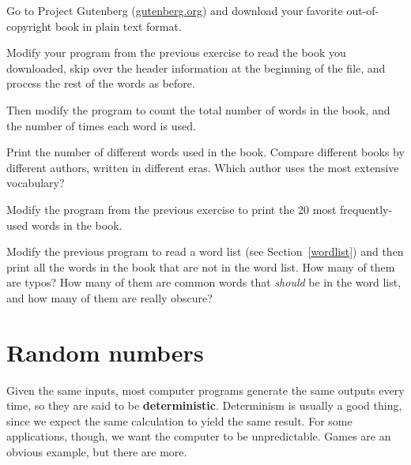 \documentclass[10pt]{book}
\begin{document}
\begin{exercise}

Go to Project Gutenberg (\url{gutenberg.org}) and download
your favorite out-of-copyright book in plain text format.

Modify your program from the previous exercise to read the book
you downloaded, skip over the header information at the beginning
of the file, and process the rest of the words as before.

Then modify the program to count the total number of words in
the book, and the number of times each word is used.

Print the number of different words used in the book.  Compare
different books by different authors, written in different eras.
Which author uses the most extensive vocabulary?
\end{exercise}


\begin{exercise}

Modify the program from the previous exercise to print the
20 most frequently-used words in the book.

\end{exercise}


\begin{exercise}

Modify the previous program to read a word list (see
Section~\ref{wordlist}) and then print all the words in the book that
are not in the word list.  How many of them are typos?  How many of
them are common words that {\em should} be in the word list, and how
many of them are really obscure?

\end{exercise}


\section{Random numbers}

Given the same inputs, most computer programs generate the same
outputs every time, so they are said to be {\bf deterministic}.
Determinism is usually a good thing, since we expect the same
calculation to yield the same result.  For some applications, though,
we want the computer to be unpredictable.  Games are an obvious
example, but there are more.
\end{document}
